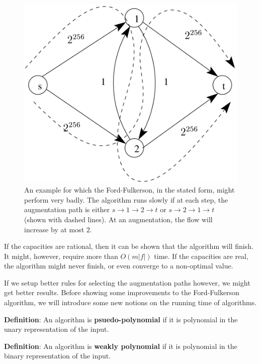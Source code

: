 \documentclass{article}
\begin{document}
\begin{figure}[h]
\begin{center}
\includegraphics{ex_badFF.png}
\caption{An example for which the Ford-Fulkerson, in the stated form,
  might perform very badly.  The algorithm runs slowly if at each step, the
  augmentation path is either $s\rightarrow 1 \rightarrow 2
  \rightarrow t$ or $s \rightarrow 2 \rightarrow 1 \rightarrow t$ (shown with
  dashed lines). At an augmentation, the flow will increase by at
  most $2$.}
\label{fig:ex_badFF}
\end{center}
\end{figure}


If the capacities are rational, then it can be shown that the
algorithm will finish.  It might, however, require more than $O(m|f|)$
time.  If the capacities are real, the algorithm might never finish,
or even converge to a non-optimal value.  

If we setup better rules for selecting the augmentation paths however,
we might get better results. Before showing some improvements to the
Ford-Fulkerson algorithm, we will introduce some new notions on the
running time of algorithms. 


\textbf{Definition}:
An algorithm is \textbf{psuedo-polynomial} if it is polynomial in the unary
representation of the input.

\textbf{Definition}:
An algorithm is \textbf{weakly polynomial} if it is polynomial in
the binary representation of the input.
    
\end{document}
